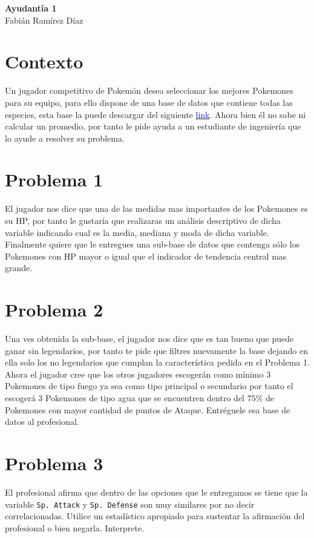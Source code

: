 \begin{center}
    \huge{
    \textbf{
        Ayudantía 1
    }
    }\\
    \normalsize{
        Fabián Ramírez Díaz
    }
\end{center}

\section*{Contexto}
Un jugador competitivo de Pokemón desea seleccionar los mejores Pokemones para su equipo, para ello dispone de una base de datos que contiene todas las especies, esta base la puede descargar del siguiente \href{https://fabimath.github.io/mat044/ay1/pokemon.csv}{\textcolor{blue}{link}}. Ahora bien él no sabe ni calcular un promedio, por tanto le pide ayuda a un estudiante de ingeniería que lo ayude a resolver su problema. 
\section*{Problema 1}
El jugador nos dice que una de las medidas mas importantes de los Pokemones es su HP, por tanto le gustaría que realizaras un análisis descriptivo de dicha variable indicando cual es la media, mediana y moda de dicha variable. Finalmente quiere que le entregues una sub-base de datos que contenga sólo los Pokemones con HP mayor o igual que el indicador de tendencia central mas grande.
\section*{Problema 2}
Una ves obtenida la sub-base, el jugador nos dice que es tan bueno que puede ganar sin legendarios, por tanto te pide que filtres nuevamente la base dejando en ella solo los no legendarios que cumplan la característica pedida en el Problema 1. Ahora el jugador cree que los otros jugadores escogerán como mínimo 3 Pokemones de tipo fuego ya sea como tipo principal o secundario por tanto el escogerá 3 Pokemones de tipo agua que se encuentren dentro del $75\%$ de Pokemones con mayor cantidad de puntos de Ataque. Entréguele         esa base de datos al profesional.
\section*{Problema 3}
El profesional afirma que dentro de las opciones que le entregamos se tiene que la variable \texttt{Sp. Attack} y \texttt{Sp. 	Defense} son muy similares por no decir correlacionadas. Utilice un estadístico apropiado para sustentar la afirmación del profesional o bien negarla. Interprete.


